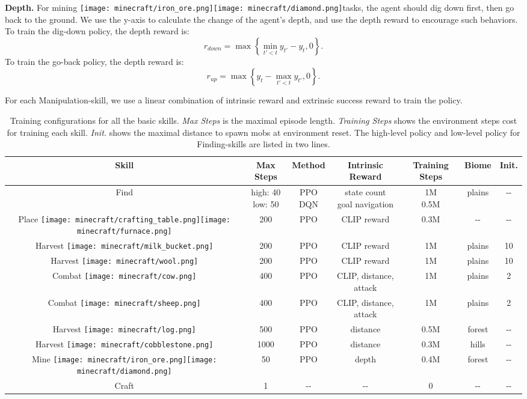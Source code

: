 \documentclass{article}
\newcommand{\mccobblestone}{\texttt{[image: minecraft/cobblestone.png]}}
\newcommand{\mccow}{\texttt{[image: minecraft/cow.png]}}
\newcommand{\mccraftingtable}{\texttt{[image: minecraft/crafting\_table.png]}}
\newcommand{\mcfurnace}{\texttt{[image: minecraft/furnace.png]}}
\newcommand{\mclog}{\texttt{[image: minecraft/log.png]}}
\newcommand{\mcmilkbucket}{\texttt{[image: minecraft/milk\_bucket.png]}}
\newcommand{\mcsheep}{\texttt{[image: minecraft/sheep.png]}}
\newcommand{\mcwool}{\texttt{[image: minecraft/wool.png]}}
\newcommand{\mcironore}{\texttt{[image: minecraft/iron\_ore.png]}}
\newcommand{\mcdiamond}{\texttt{[image: minecraft/diamond.png]}}
\begin{document}
\textbf{Depth.} For mining \mcironore\mcdiamond tasks, the agent should dig down first, then go back to the ground. We use the y-axis to calculate the change of the agent's depth, and use the depth reward to encourage such behaviors. To train the dig-down policy, the depth reward is:
\begin{equation}
    r_{down} = \max \left\{ \min_{t'<t}{y_{t'}} - y_t, 0 \right\}.
\end{equation}
To train the go-back policy, the depth reward is:
\begin{equation}
    r_{up} = \max \left\{ y_t - \max_{t'<t}{y_{t'}}, 0 \right\}.
\end{equation}

For each Manipulation-skill, we use a linear combination of intrinsic reward and extrinsic success reward to train the policy.

\begin{table}[!t]
  \caption{Training configurations for all the basic skills. \textit{Max Steps} is the maximal episode length. \textit{Training Steps} shows the environment steps cost for training each skill.  \textit{Init.} shows the maximal distance to spawn mobs at environment reset. The high-level policy and low-level policy for Finding-skills are listed in two lines.}
  \label{tab:skill-train}
  \centering
  \begin{tabular}{ccccccc}
    \toprule
    Skill  & Max Steps & Method & Intrinsic Reward & Training Steps & Biome & Init. \\
    \midrule
    Find  &  \makecell{high: 40 \\ low: 50} & \makecell{PPO \\ DQN} & \makecell{state count \\ goal navigation} & \makecell{1M \\ 0.5M} & plains & \--\-- \\
    \midrule
    Place \mccraftingtable\mcfurnace & 200 & PPO & CLIP reward & 0.3M & \--\-- & \--\-- \\
    Harvest \mcmilkbucket & 200 & PPO & CLIP reward & 1M & plains & 10 \\
    Harvest \mcwool & 200 & PPO & CLIP reward & 1M & plains & 10 \\
    Combat \mccow & 400 & PPO & CLIP, distance, attack & 1M & plains & 2 \\
    Combat \mcsheep & 400 & PPO & CLIP, distance, attack & 1M & plains & 2 \\
    Harvest \mclog & 500 & PPO & distance & 0.5M & forest & \--\-- \\
    Harvest \mccobblestone & 1000 & PPO & distance & 0.3M & hills & \--\-- \\
    Mine \mcironore\mcdiamond & 50 & PPO & depth & 0.4M & forest & \--\-- \\
    \midrule
    Craft & 1 & \--\-- & \--\-- & 0 & \--\-- & \--\-- \\
    \bottomrule
  \end{tabular}
\end{table}
\end{document}
